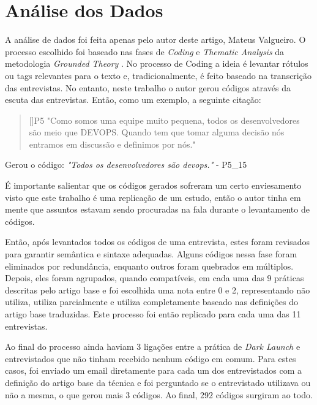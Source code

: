 \section{Análise dos Dados}


A análise de dados foi feita apenas pelo autor deste artigo, Mateus Valgueiro. O processo escolhido foi baseado nas fases de \emph{Coding} e \emph{Thematic Analysis} da metodologia \emph{Grounded Theory} \cite{groundedTheory}. No processo de Coding a ideia é levantar rótulos ou tags relevantes para o texto e, tradicionalmente, é feito baseado na transcrição das entrevistas. No entanto, neste trabalho o autor gerou códigos através da escuta das entrevistas. Então, como um exemplo, a seguinte citação:

\begin{quotation}[]{P5}
"Como somos uma equipe muito pequena, todos os desenvolvedores são meio que DEVOPS. Quando tem que tomar alguma decisão nós entramos em discussão e definimos por nós."
\end{quotation}

Gerou o código: \emph{"Todos os desenvolvedores são devops."} - P5\_15

É importante salientar que os códigos gerados sofreram um certo enviesamento visto que este trabalho é uma replicação de um estudo, então o autor tinha em mente que assuntos estavam sendo procuradas na fala durante o levantamento de códigos. 

Então, após levantados todos os códigos de uma entrevista, estes foram revisados para garantir semântica e sintaxe adequadas. Alguns códigos nessa fase foram eliminados por redundância, enquanto outros foram quebrados em múltiplos. Depois, eles foram agrupados, quando compatíveis, em cada uma das 9 práticas descritas pelo artigo base e foi escolhida uma nota entre 0 e 2, representando não utiliza, utiliza parcialmente e utiliza completamente baseado nas definições do artigo base traduzidas. Este processo foi então replicado para cada uma das 11 entrevistas.

Ao final do processo ainda haviam 3 ligações entre a prática de \emph{Dark Launch} e entrevistados que não tinham recebido nenhum código em comum. Para estes casos, foi enviado um email diretamente para cada um dos entrevistados com a definição do artigo base da técnica e foi perguntado se o entrevistado utilizava ou não a mesma, o que gerou mais 3 códigos. Ao final, 292 códigos surgiram ao todo.

